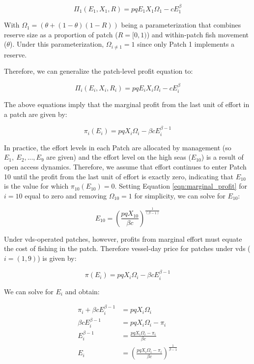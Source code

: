 \documentclass[12pt]{article}
\begin{document}
$$
\Pi_1(E_1,X_1,R) = pqE_1X_1\Omega_1-cE_1^\beta
$$

With $\Omega_1 = (\theta + (1 - \theta)(1 - R))$ being a parameterization that combines reserve size as a proportion of patch ($R =  [0, 1)$) and within-patch fish movement ($\theta$). Under this parameterization, $\Omega_{i \neq 1} = 1$ since only Patch 1 implements a reserve.

Therefore, we can generalize the patch-level profit equation to:

$$
\Pi_i(E_i,X_i, R_i) = pqE_iX_i\Omega_i-cE_i^\beta
$$

The above equations imply that the marginal profit from the last unit of effort in a patch are given by:

\begin{equation}
\pi_i(E_i) = pqX_i\Omega_i - \beta cE_i^{\beta-1}
\label{eqn:marginal_profit}
\end{equation}

In practice, the effort levels in each Patch are allocated by management (so $E_{1},\ E_{2},...,E_{9}$ are given) and the
effort level on the high seas ($E_{10}$) is a result of open access dynamics. Therefore, we assume that effort continues to enter Patch 10 until the profit from the last unit of effort is exactly zero, indicating that $E_{10}$ is the value for which $\pi_{10}(E_{10})  = 0$. Setting Equation \ref{eqn:marginal_profit} for $i = 10$ equal to zero and removing $\Omega_{10} = 1$ for simplicity, we can solve for $E_{10}$:

\begin{equation}
E_{10} = \left(\frac{pqX_{10}}{\beta c}\right)^{\frac{1}{(\beta - 1)}}
\label{eqn:effort_hs}
\end{equation}

Under vds-operated patches, however, profits from marginal effort must equate the cost of fishing in the patch. Therefore vessel-day price for patches under vds ($i = (1, 9)$) is  given by:

$$
\pi(E_i) = pqX_i\Omega_i - \beta c E_i ^{\beta - 1}
$$

We can solve for $E_i$ and obtain:

\begin{equation}
	\begin{split}
		\pi_i + \beta c E_i ^{\beta - 1} &= pqX_i\Omega_i \\
		\beta c E_i ^{\beta - 1} &= pqX_i\Omega_i - \pi_i \\
		E_i ^{\beta - 1} &= \frac{pqX_i\Omega_i - \pi_i}{\beta c} \\
		E_i &= \left(\frac{pqX_i\Omega_i - \pi_i}{\beta c }\right) ^ {\frac{1}{\beta - 1}}
	\end{split}
\label{eqn:demands}
\end{equation}
\end{document}
